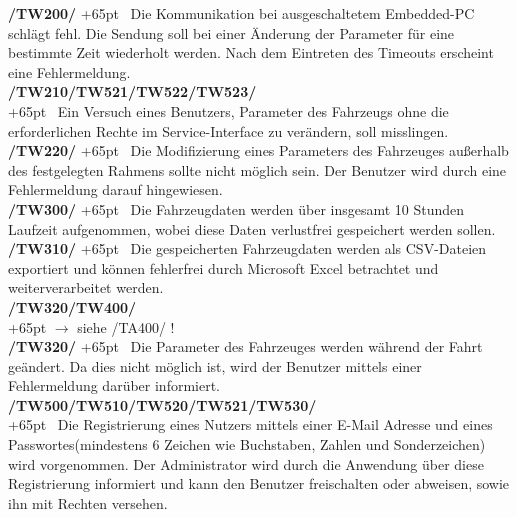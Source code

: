 \documentclass[fontsize = 12pt, paper = a4]{scrreprt}
\begin{document}
\textbf{/TW200/} 
\hangindent+65pt 
\ Die Kommunikation bei ausgeschaltetem \gls{Embedded-PC} schlägt fehl. Die Sendung soll bei einer Änderung der Parameter für eine bestimmte Zeit wiederholt werden. Nach dem Eintreten des \gls{Timeout}s erscheint eine Fehlermeldung. \\

\textbf{/TW210/TW521/TW522/TW523/} \\
\hangindent+65pt 
\ Ein Versuch eines Benutzers, Parameter des Fahrzeugs ohne die erforderlichen  \gls{Recht}e im \gls{Service-Interface} zu verändern, soll misslingen. \\

\textbf{/TW220/} 
\hangindent+65pt 
\ Die Modifizierung eines Parameters des Fahrzeuges außerhalb des festgelegten Rahmens sollte nicht möglich sein. Der Benutzer wird durch eine Fehlermeldung darauf hingewiesen. \\

\textbf{/TW300/} 
\hangindent+65pt 
\ Die Fahrzeugdaten werden über insgesamt 10 Stunden Laufzeit aufgenommen, wobei diese Daten verlustfrei gespeichert werden sollen. \\

\textbf{/TW310/} 
\hangindent+65pt 
\ Die gespeicherten Fahrzeugdaten werden als \gls{CSV}-Dateien exportiert und können fehlerfrei durch Microsoft Excel betrachtet und weiterverarbeitet werden. \\

\textbf{/TW320/TW400/} \\
\hangindent+65pt 
$\rightarrow$ siehe /TA400/ ! \\

\textbf{/TW320/} 
\hangindent+65pt 
\ Die Parameter des Fahrzeuges werden während der Fahrt geändert. Da dies   nicht möglich ist, wird der Benutzer mittels einer Fehlermeldung darüber informiert. \\


\textbf{/TW500/TW510/TW520/TW521/TW530/} \\
\hangindent+65pt 
\ Die Registrierung eines Nutzers mittels einer E-Mail Adresse und eines Passwortes(mindestens 6 Zeichen wie Buchstaben, Zahlen und Sonderzeichen) wird vorgenommen. Der Administrator wird durch die Anwendung über diese Registrierung informiert und kann den Benutzer freischalten oder abweisen, sowie ihn mit \gls{Recht}en versehen. \\
  
\end{document}
